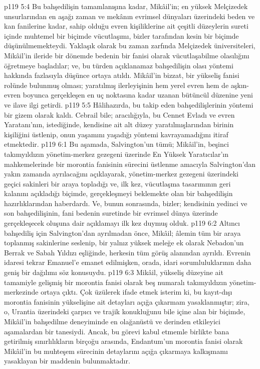 \vs p119 5:4 Bu bahşedilişin tamamlanışına kadar, Mikâil’in; en yüksek Melçizedek unsurlarından en aşağı zaman ve mekânın evrimsel dünyaları üzerindeki beden ve kan fanilerine kadar, sahip olduğu evren kişiliklerine ait çeşitli düzeylerin sureti içinde muhtemel bir biçimde vücutlaşımı, bizler tarafından kesin bir biçimde düşünülmemekteydi. Yaklaşık olarak bu zaman zarfında Melçizedek üniversiteleri, Mikâil’in ileride bir dönemde bedenin bir fanisi olarak vücutlaşabilme olasılığını öğretmeye başladılar; ve, bu türden açıklanamaz bahşedilişin olası yöntemi hakkında fazlasıyla düşünce ortaya atıldı. Mikâil’in bizzat, bir yükseliş fanisi rolünde bulunmuş olması; yaratılmış ilerleyişinin hem yerel evren hem de aşkın\hyp{}evren boyunca gerçekleşen en uç noktasına kadar uzanan bütüncül düzenine yeni ve ilave ilgi getirdi.
\vs p119 5:5 Hâlihazırda, bu takip eden bahşedilişlerinin yöntemi bir gizem olarak kaldı. Cebrail bile; aracılığıyla, bu Cennet Evladı ve evren Yaratanı’nın, istediğinde, kendisine ait alt düzey yaratılmışlarından birinin kişiliğini üstlenip, onun yaşamını yaşadığı yöntemi kavrayamadığını itiraf etmektedir.
\vs p119 6:1 Bu aşamada, Salvington’un tümü; Mikâil’in, beşinci takımyıldızın yönetim\hyp{}merkez gezegeni üzerinde En Yüksek Yaratıcılar’ın mahkemelerinde bir morontia fanisinin sürecini üstlenme amacıyla Salvington’dan yakın zamanda ayrılacağını açıklayarak, yönetim\hyp{}merkez gezegeni üzerindeki geçici sakinleri bir araya topladığı ve, ilk kez, vücutlaşma tasarımının geri kalanını açıkladığı biçimde, gerçekleşmeyi beklemekte olan bir bahşedilişin hazırlıklarından haberdardı. Ve, bunun sonrasında, bizler; kendisinin yedinci ve son bahşedilişinin, fani bedenin suretinde bir evrimsel dünya üzerinde gerçekleşecek oluşuna dair açıklamayı ilk kez duymuş olduk.
\vs p119 6:2 Altıncı bahşediliş için Salvington’dan ayrılmadan önce, Mikâil; âlemin tüm bir araya toplanmış sakinlerine seslenip, bir yalnız yüksek meleğe ek olarak Nebadon’un Berrak ve Sabah Yıldızı eşliğinde, herkesin tüm görüş alanından ayrıldı. Evrenin idaresi tekrar Emanuel’e emanet edilmişken, orada, idari sorumluluklarının daha geniş bir dağılımı söz konusuydu.
\vs p119 6:3 Mikâil, yükseliş düzeyine ait tamamiyle gelişmiş bir morontia fanisi olarak beş numaralı takımyıldızın yönetim\hyp{}merkezinde ortaya çıktı. Çok üzülerek ifade etmek isterim ki, bu kayıt\hyp{}dışı morontia fanisinin yükselişine ait detayları açığa çıkarmam yasaklanmıştır; zira, o, Urantia üzerindeki çarpıcı ve trajik konukluğunu bile içine alan bir biçimde, Mikâil’in bahşedilme deneyiminde en olağanüstü ve derinden etkileyici aşamalardan bir tanesiydi. Ancak, bu görevi kabul etmemle birlikte bana getirilmiş sınırlılıkların birçoğu arasında, Endantum’un morontia fanisi olarak Mikâil’in bu muhteşem sürecinin detaylarını açığa çıkarmaya kalkışmamı yasaklayan bir maddenin bulunmaktadır.
